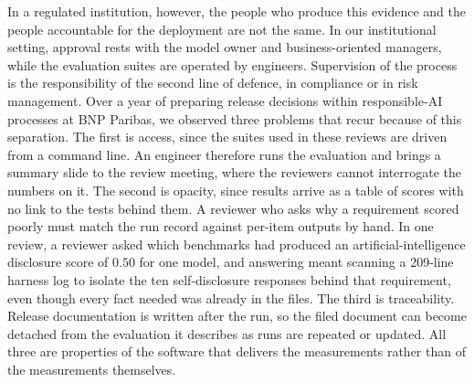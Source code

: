 \documentclass[10pt,conference]{IEEEtran}
\begin{document}
In a regulated institution, however, the people who produce this evidence and the people accountable for the deployment are not the same.
In our institutional setting, approval rests with the model owner and business-oriented managers, while the evaluation suites are operated by engineers.
Supervision of the process is the responsibility of the second line of defence, in compliance or in risk management.
Over a year of preparing release decisions within responsible-AI processes at BNP Paribas, we observed three problems that recur because of this separation.
The first is access, since the suites used in these reviews are driven from a command line.
An engineer therefore runs the evaluation and brings a summary slide to the review meeting, where the reviewers cannot interrogate the numbers on it.
The second is opacity, since results arrive as a table of scores with no link to the tests behind them.
A reviewer who asks why a requirement scored poorly must match the run record against per-item outputs by hand.
In one review, a reviewer asked which benchmarks had produced an artificial-intelligence disclosure score of $0.50$ for one model, and answering meant scanning a 209-line harness log to isolate the ten self-disclosure responses behind that requirement, even though every fact needed was already in the files.
The third is traceability.
Release documentation is written after the run, so the filed document can become detached from the evaluation it describes as runs are repeated or updated.
All three are properties of the software that delivers the measurements rather than of the measurements themselves.
\end{document}
